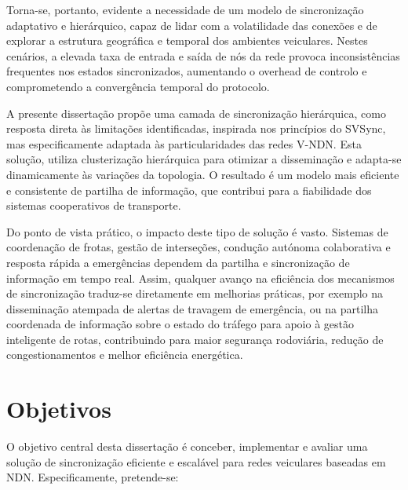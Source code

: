 Torna-se, portanto, evidente a necessidade de um modelo de sincronização adaptativo e hierárquico, capaz de lidar com a volatilidade das conexões e de explorar a estrutura geográfica e temporal dos ambientes veiculares. Nestes cenários, a elevada taxa de entrada e saída de nós da rede provoca inconsistências frequentes nos estados sincronizados, aumentando o overhead de controlo e comprometendo a convergência temporal do protocolo.

A presente dissertação propõe uma camada de sincronização hierárquica, como resposta direta às limitações identificadas, inspirada nos princípios do SVSync, mas especificamente adaptada às particularidades das redes \gls{V-NDN}. Esta solução, utiliza clusterização hierárquica para otimizar a disseminação e adapta-se dinamicamente às variações da topologia. O resultado é um modelo mais eficiente e consistente de partilha de informação, que contribui para a fiabilidade dos sistemas cooperativos de transporte.  

Do ponto de vista prático, o impacto deste tipo de solução é vasto. Sistemas de coordenação de frotas, gestão de interseções, condução autónoma colaborativa e resposta rápida a emergências dependem da partilha e sincronização de informação em tempo real. Assim, qualquer avanço na eficiência dos mecanismos de sincronização traduz-se diretamente em melhorias práticas, por exemplo na disseminação atempada de alertas de travagem de emergência, ou na partilha coordenada de informação sobre o estado do tráfego para apoio à gestão inteligente de rotas, contribuindo para maior segurança rodoviária, redução de congestionamentos e melhor eficiência energética.

\section{Objetivos}
\label{sec:objetivos}

O objetivo central desta dissertação é conceber, implementar e avaliar uma solução de sincronização eficiente e escalável para redes veiculares baseadas em \gls{NDN}. Especificamente, pretende-se:

